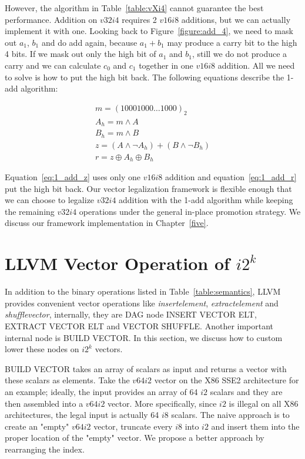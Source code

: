 However, the algorithm in Table~\ref{table:vXi4} cannot guarantee the best performance. Addition on $v32i4$ requires 2 $v16i8$ additions, but we can actually implement it with one. Looking back to Figure~\ref{figure:add_4}, we need to mask out $a_1$, $b_1$ and do add again, because $a_1 + b_1$ may produce a carry bit to the high 4 bits. If we mask out only the high bit of $a_1$ and $b_1$, still we do not produce a carry and we can calculate $c_0$ and $c_1$ together in one $v16i8$ addition. All we need to solve is how to put the high bit back. The following equations describe the 1-add algorithm:

\begin{gather}
  m = (10001000 \ldots 1000)_2 \\
  A_h = m \land A \\
  B_h = m \land B \\
  z = (A \land \lnot A_h) + (B \land \lnot B_h) \label{eq:1_add_z}\\
  r = z \oplus A_h \oplus B_h \label{eq:1_add_r}
\end{gather}

Equation~\eqref{eq:1_add_z} uses only one $v16i8$ addition and equation~\eqref{eq:1_add_r} put the high bit back. Our vector legalization framework is flexible enough that we can choose to legalize $v32i4$ addition with the 1-add algorithm while keeping the remaining $v32i4$ operations under the general in-place promotion strategy. We discuss our framework implementation in Chapter~\ref{five}.

\section{LLVM Vector Operation of $i2^k$}
In addition to the binary operations listed in Table~\ref{table:semantics}, LLVM provides convenient vector operations like \textit{insertelement}, \textit{extractelement} and \textit{shufflevector}, internally, they are DAG node INSERT VECTOR ELT, EXTRACT VECTOR ELT and VECTOR SHUFFLE\@. Another important internal node is BUILD VECTOR\@. In this section, we discuss how to custom lower these nodes on $i2^k$ vectors.

BUILD VECTOR takes an array of scalars as input and returns a vector with these scalars as elements. Take the $v64i2$ vector on the X86 SSE2 architecture for an example; ideally, the input provides an array of 64 $i2$ scalars and they are then assembled into a $v64i2$ vector. More specifically, since $i2$ is illegal on all X86 architectures, the legal input is actually 64 $i8$ scalars. The naive approach is to create an "empty" $v64i2$ vector, truncate every $i8$ into $i2$ and insert them into the proper location of the "empty" vector. We propose a better approach by rearranging the index.


